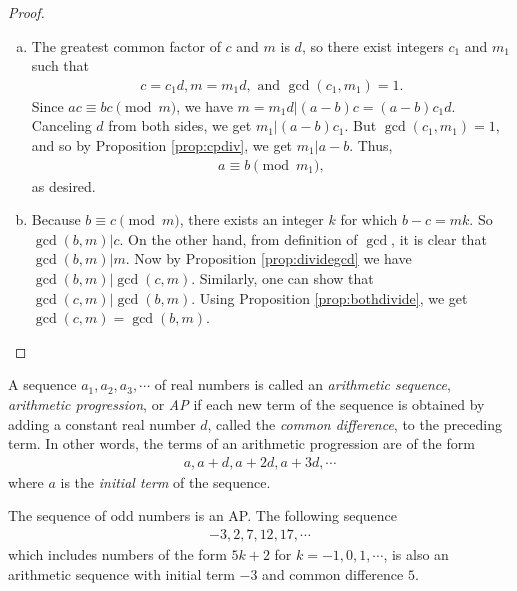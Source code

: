 \documentclass{subfile}
\begin{document}
	\begin{proof}
		$ $
		\begin{enumerate}[(a)]
			\item The greatest common factor of $c$ and $m$ is $d$, so  there exist integers $c_1$ and $m_1$ such that
				\begin{align*}
				 c=c_1d, m = m_1 d, \text{ and } \gcd(c_1,m_1) = 1.
				\end{align*}
			Since $ac \equiv bc \pmod m$, we have $m=m_1d|(a-b)c=(a-b)c_1d$. Canceling $d$ from both sides, we get $m_1 | (a-b)c_1$. But $\gcd(c_1,m_1)=1$, and so by Proposition \ref{prop:cpdiv}, we get $m_1|a-b$. Thus,
				\begin{align*} 
				a \equiv b \pmod{m_1},
				\end{align*}
			as desired.
			
			\item Because $b \equiv c \pmod m$, there exists an integer $k$ for which $b-c=mk$. So $\gcd(b,m)|c$. On the other hand, from definition of $\gcd$, it is clear that $\gcd(b,m)|m$. Now by Proposition \ref{prop:dividegcd} we have $\gcd(b,m)|\gcd(c,m)$. Similarly, one can show that $\gcd(c,m)|\gcd(b,m)$. Using Proposition \ref{prop:bothdivide}, we get $\gcd(c,m)=\gcd(b,m)$. 
		\end{enumerate}
	\end{proof}
	
	\begin{definition}\label{def:AP}
		A sequence $a_1, a_2, a_3, \cdots$ of real numbers is called an \textit{arithmetic sequence}, \textit{arithmetic progression}, or \textit{AP} if each new term of the sequence is obtained by adding a constant real number $d$, called the \textit{common difference}, to the preceding term. In other words, the terms of an arithmetic progression are of the form
			\begin{align*}
				a, a+d, a+2d, a+3d, \cdots
			\end{align*}
		where $a$ is the \textit{initial term} of the sequence.
	\end{definition}
	
	\begin{example}
		The sequence of odd numbers is an AP. The following sequence
			\begin{align*}
				-3, 2, 7, 12, 17, \cdots
			\end{align*}
		which includes numbers of the form $5k+2$ for $k=-1,0,1,\cdots$, is also an arithmetic sequence with initial term $-3$ and common difference $5$.
	\end{example}
	
\end{document}
